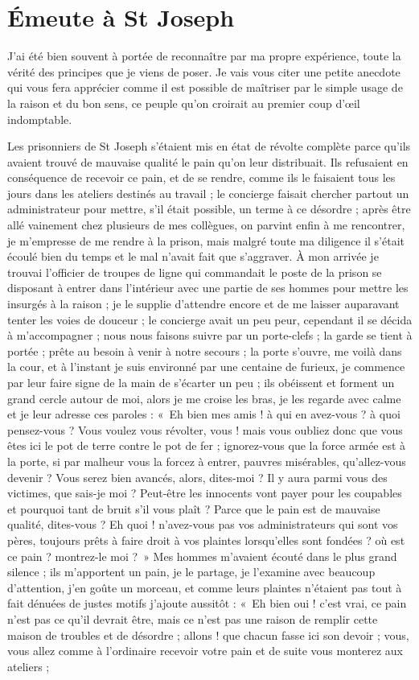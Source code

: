 \documentclass[11pt,a4paper]{report}
\begin{document}
\section*{Émeute à St Joseph}

J'ai été bien souvent à portée de reconnaître par ma propre expérience, toute la vérité des principes que je viens de poser. Je vais vous citer une petite anecdote qui vous fera apprécier comme il est possible de maîtriser par le simple usage de la raison et du bon sens, ce peuple qu'on croirait au premier coup d'œil indomptable.

Les prisonniers de St Joseph s'étaient mis en état de révolte complète parce qu'ils avaient trouvé de mauvaise qualité le pain qu'on leur distribuait. Ils refusaient en conséquence de recevoir ce pain, et de se rendre, comme ils le faisaient tous les jours dans les ateliers destinés au travail ; le concierge faisait chercher partout un administrateur pour mettre, s'il était possible, un terme à ce désordre ; après être allé vainement chez plusieurs de mes collègues, on parvint enfin à me rencontrer, je m'empresse de me rendre à la prison, mais malgré toute ma diligence il s'était écoulé bien du temps et le mal n'avait fait que s'aggraver. À mon arrivée je trouvai l'officier de troupes de ligne qui commandait le poste de la prison se disposant à entrer dans l'intérieur avec une partie de ses hommes pour mettre les insurgés à la raison ; je le supplie d'attendre encore et de me laisser auparavant tenter les voies de douceur ; le concierge avait un peu peur, cependant il se décida à m'accompagner ; nous nous faisons suivre par un porte-clefs ; la garde se tient à portée ; prête au besoin à venir à notre secours ; la porte s'ouvre, me voilà dans la cour, et à l'instant je suis environné par une centaine de furieux, je commence par leur faire signe de la main de s'écarter un peu ; ils obéissent et forment un grand cercle autour de moi, alors je me croise les bras, je les regarde avec calme et je leur adresse ces paroles : «~Eh bien mes amis ! à qui en avez-vous ? à quoi pensez-vous ? Vous voulez vous révolter, vous ! mais vous oubliez donc que vous êtes ici le pot de terre contre le pot de fer ; ignorez-vous que la force armée est à la porte, si par malheur vous la forcez à entrer, pauvres misérables, qu'allez-vous devenir ? Vous serez bien avancés, alors, dites-moi ? Il y aura parmi vous des victimes, que sais-je moi ? Peut-être les innocents vont payer pour les coupables et pourquoi tant de bruit s'il vous plaît ? Parce que le pain est de mauvaise qualité, dites-vous ? Eh quoi ! n'avez-vous pas vos administrateurs qui sont vos pères, toujours prêts à faire droit à vos plaintes lorsqu'elles sont fondées ? où est ce pain ? montrez-le moi ?~» Mes hommes m'avaient écouté dans le plus grand silence ; ils m'apportent un pain, je le partage, je l'examine avec beaucoup d'attention, j'en goûte un morceau, et comme leurs plaintes n'étaient pas tout à fait dénuées de justes motifs j'ajoute aussitôt : «~Eh bien oui ! c'est vrai, ce pain n'est pas ce qu'il devrait être, mais ce n'est pas une raison de remplir cette maison de troubles et de désordre ; allons ! que chacun fasse ici son devoir ; vous, vous allez comme à l'ordinaire recevoir votre pain et de suite vous monterez aux ateliers ; 
\end{document}
